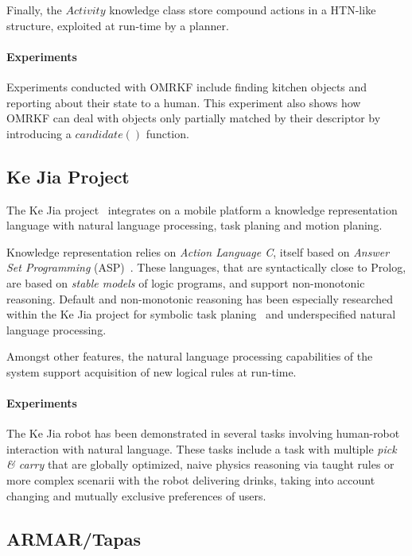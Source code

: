 Finally, the $Activity$ knowledge class store compound actions in a HTN-like
structure, exploited at run-time by a planner.

\paragraph{Experiments} Experiments conducted with OMRKF include finding
kitchen objects and reporting about their state to a human.  This experiment
also shows how OMRKF can deal with objects only partially matched by their
descriptor by introducing a $candidate()$ function.

\subsection{Ke Jia Project}
\label{sect|kejia}

The Ke Jia project~\cite{Chen2010} integrates on a mobile platform a knowledge
representation language with natural language processing, task planing and
motion planing.

Knowledge representation relies on \emph{Action Language C}, itself based on
\emph{Answer Set Programming} (ASP)~\cite{Gelfond2008}. These languages, that
are syntactically close to Prolog, are based on \emph{stable models} of logic
programs, and support non-monotonic reasoning. Default and non-monotonic
reasoning has been especially researched within the Ke Jia project for symbolic
task planing~\cite{Ji2011} and underspecified natural language processing.

Amongst other features, the natural language processing capabilities of the
system support acquisition of new logical rules at run-time.

\paragraph{Experiments} The Ke Jia robot has been demonstrated in several tasks
involving human-robot interaction with natural language. These tasks include a
task with multiple \emph{pick \& carry} that are globally optimized, naive
physics reasoning via taught rules or more complex scenarii with the robot
delivering drinks, taking into account changing and mutually exclusive
preferences of users.

\subsection{ARMAR/Tapas}

